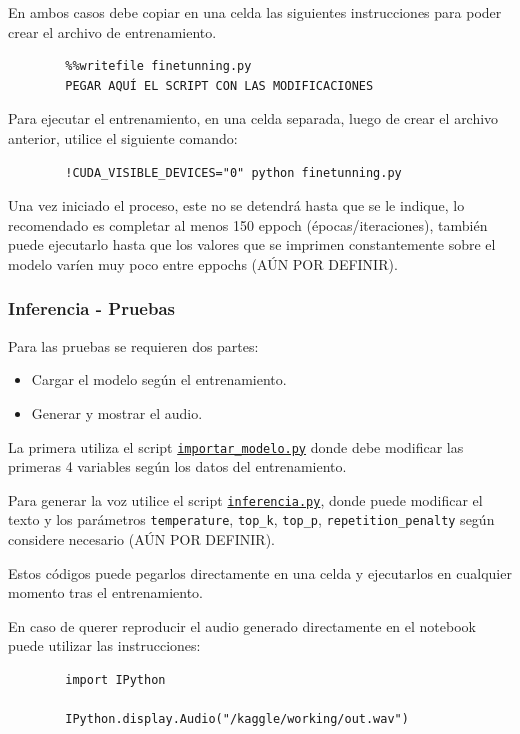     En ambos casos debe copiar en una celda las siguientes instrucciones para poder crear el archivo de entrenamiento.
    \begin{verbatim}
        %%writefile finetunning.py
        PEGAR AQUÍ EL SCRIPT CON LAS MODIFICACIONES
    \end{verbatim}

    Para ejecutar el entrenamiento, en una celda separada, luego de crear el archivo anterior, utilice el siguiente comando:
    \begin{verbatim}
        !CUDA_VISIBLE_DEVICES="0" python finetunning.py
    \end{verbatim}

    Una vez iniciado el proceso, este no se detendrá hasta que se le indique, lo recomendado es completar al menos 150 eppoch (épocas/iteraciones), también puede ejecutarlo hasta que los valores que se imprimen constantemente sobre el modelo varíen muy poco entre eppochs (AÚN POR DEFINIR).
    
    \subsubsection{Inferencia - Pruebas}
    Para las pruebas se requieren dos partes:
    \begin{itemize}
        \item Cargar el modelo según el entrenamiento.
        \item Generar y mostrar el audio.
    \end{itemize}

    La primera utiliza el script \href{https://github.com/LSBR29/Procesamiento-de-Voces-TCU-748/blob/main/coquiTTS_Kaggle/importar_modelo.py}{\texttt{importar\_modelo.py}} donde debe modificar las primeras 4 variables según los datos del entrenamiento.

    Para generar la voz utilice el script \href{https://github.com/LSBR29/Procesamiento-de-Voces-TCU-748/blob/main/coquiTTS_Kaggle/inferencia.py}{\texttt{inferencia.py}}, donde puede modificar el texto y los parámetros \texttt{temperature}, \texttt{top\_k}, \texttt{top\_p}, \texttt{repetition\_penalty} según considere necesario (AÚN POR DEFINIR).

    Estos códigos puede pegarlos directamente en una celda y ejecutarlos en cualquier momento tras el entrenamiento.

    En caso de querer reproducir el audio generado directamente en el notebook puede utilizar las instrucciones:
    \begin{verbatim}
        import IPython

        IPython.display.Audio("/kaggle/working/out.wav")
    \end{verbatim}

